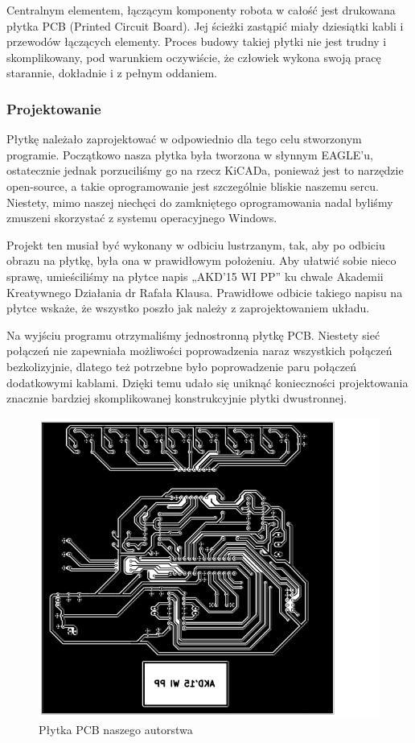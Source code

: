 Centralnym elementem, łączącym komponenty robota w całość jest drukowana płytka PCB (Printed Circuit Board). Jej ścieżki zastąpić miały dziesiątki kabli i przewodów łączących elementy. Proces budowy takiej płytki nie jest trudny i skomplikowany, pod warunkiem oczywiście, że człowiek wykona swoją pracę starannie, dokładnie i z pełnym oddaniem.

\subsubsection{Projektowanie}

Płytkę należało zaprojektować w odpowiednio dla tego celu stworzonym programie. Początkowo nasza płytka była tworzona w słynnym EAGLE'u, ostatecznie jednak porzuciliśmy go na rzecz KiCADa, ponieważ jest to narzędzie open-source, a takie oprogramowanie jest szczególnie bliskie naszemu sercu. Niestety, mimo naszej niechęci do zamkniętego oprogramowania nadal byliśmy zmuszeni skorzystać z systemu operacyjnego Windows.  

Projekt ten musiał być wykonany w odbiciu lustrzanym, tak, aby po odbiciu obrazu na płytkę, była ona w prawidłowym położeniu. Aby ułatwić sobie nieco sprawę, umieściliśmy na płytce napis „AKD’15 WI PP” ku chwale Akademii Kreatywnego Działania dr Rafała Klausa.
Prawidłowe odbicie takiego napisu na płytce wskaże, że wszystko poszło jak należy z zaprojektowaniem układu. 

Na wyjściu programu otrzymaliśmy jednostronną płytkę PCB. Niestety sieć połączeń nie zapewniała możliwości poprowadzenia naraz wszystkich połączeń bezkolizyjnie, dlatego też potrzebne było poprowadzenie paru połączeń dodatkowymi kablami. Dzięki temu udało się uniknąć konieczności projektowania znacznie bardziej skomplikowanej konstrukcyjnie płytki dwustronnej. 

\begin{figure}
\includegraphics[scale=0.8]{board.png}
\caption{Płytka PCB naszego autorstwa}
\end{figure}
